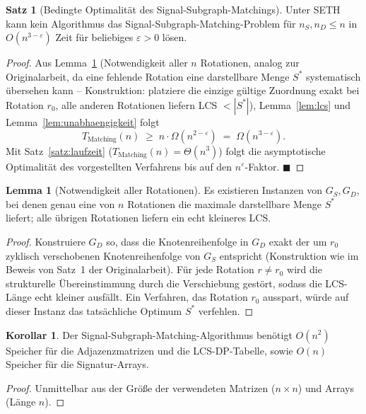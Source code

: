 ﻿\documentclass[a4paper,12pt]{article}
\theoremstyle{definition}
\newtheorem{satz}{Satz}
\newtheorem{lemma}{Lemma}
\newtheorem{korollar}{Korollar}
\begin{document}
\begin{satz}[Bedingte Optimalität des Signal-Subgraph-Matchings]
\label{satz:optimalitaet}
	Unter SETH kann kein Algorithmus das Signal-Subgraph-Matching-Problem für $n_S, n_D \leq n$ in $O(n^{3-\varepsilon})$ Zeit für beliebiges $\varepsilon > 0$ lösen.
\end{satz}
\begin{proof}
	Aus Lemma~\ref{lem:rotationen-impl} (Notwendigkeit aller $n$ Rotationen, analog zur Originalarbeit, da eine fehlende Rotation eine darstellbare Menge $S^\ast$ systematisch übersehen kann -- Konstruktion: platziere die einzige gültige Zuordnung exakt bei Rotation $r_0$, alle anderen Rotationen liefern LCS $< |S^\ast|$), Lemma~\ref{lem:lcs} und Lemma~\ref{lem:unabhaengigkeit} folgt
	\[
	T_{\text{Matching}}(n) \;\geq\; n \cdot \Omega(n^{2-\varepsilon}) \;=\; \Omega(n^{3-\varepsilon}).
	\]
	Mit Satz~\ref{satz:laufzeit} ($T_{\text{Matching}}(n) = \Theta(n^3)$) folgt die asymptotische Optimalität des vorgestellten Verfahrens bis auf den $n^\varepsilon$-Faktor. $\blacksquare$
\end{proof}

\begin{lemma}[Notwendigkeit aller Rotationen]
\label{lem:rotationen-impl}
	Es existieren Instanzen von $G_S, G_D$, bei denen genau eine von $n$ Rotationen die maximale darstellbare Menge $S^\ast$ liefert; alle übrigen Rotationen liefern ein echt kleineres LCS.
\end{lemma}
\begin{proof}
	Konstruiere $G_D$ so, dass die Knotenreihenfolge in $G_D$ exakt der um $r_0$ zyklisch verschobenen Knotenreihenfolge von $G_S$ entspricht (Konstruktion wie im Beweis von Satz~1 der Originalarbeit). Für jede Rotation $r \neq r_0$ wird die strukturelle Übereinstimmung durch die Verschiebung gestört, sodass die LCS-Länge echt kleiner ausfällt. Ein Verfahren, das Rotation $r_0$ ausspart, würde auf dieser Instanz das tatsächliche Optimum $S^\ast$ verfehlen.
\end{proof}

\begin{korollar}
\label{kor:speicher}
	Der Signal-Subgraph-Matching-Algorithmus benötigt $O(n^2)$ Speicher für die Adjazenzmatrizen und die LCS-DP-Tabelle, sowie $O(n)$ Speicher für die Signatur-Arrays.
\end{korollar}
\begin{proof}
	Unmittelbar aus der Größe der verwendeten Matrizen ($n \times n$) und Arrays (Länge $n$).
\end{proof}
\end{document}
